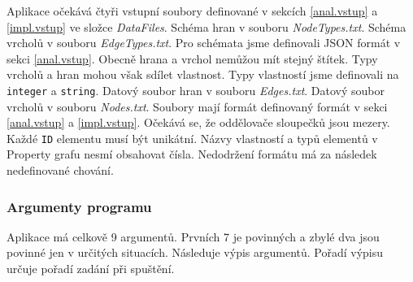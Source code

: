 Aplikace očekává čtyři vstupní soubory definované v sekcích \ref{anal.vstup} a \ref{impl.vstup} ve složce \textit{DataFiles}.
Schéma hran v souboru \textit{NodeTypes.txt}.
Schéma vrcholů v souboru \textit{EdgeTypes.txt}.
Pro schémata jsme definovali JSON formát v sekci \ref{anal.vstup}.
Obecně hrana a vrchol nemůžou mít stejný štítek.
Typy vrcholů a hran mohou však sdílet vlastnost.
Typy vlastností jsme definovali na \texttt{integer} a \texttt{string}. 
Datový soubor hran v souboru \textit{Edges.txt}.
Datový soubor vrcholů v souboru \textit{Nodes.txt}.
Soubory mají formát definovaný formát v sekci \ref{anal.vstup} a \ref{impl.vstup}.
Očekává se, že oddělovače sloupečků jsou mezery.
Každé \texttt{ID} elementu musí být unikátní.
Názvy vlastností a typů elementů v Property grafu nesmí obsahovat čísla.
Nedodržení formátu má za následek nedefinované chování.

\subsubsection{Argumenty programu} \label{impl.arguments}

Aplikace má celkově 9 argumentů.
Prvních 7 je povinných a zbylé dva jsou povinné jen v určitých situacích.
Následuje výpis argumentů.
Pořadí výpisu určuje pořadí zadání při spuštění.

